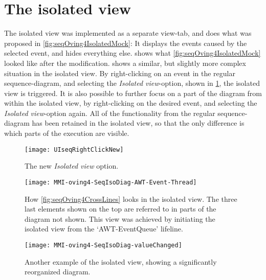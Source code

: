 \section{The isolated view}\label{isoView}

The isolated view was implemented as a separate view-tab, and does what was proposed in \cref{fig:seqOving4IsolatedMock}: It displays the events caused by the selected event, and hides everything else.
 shows what \cref{fig:seqOving4IsolatedMock} looked like after the modification.
 shows a similar, but slightly more complex situation in the isolated view.
By right-clicking on an event in the regular sequence-diagram, and selecting the \emph{Isolated view}-option, shown in \cref{fig:UISeqRightClickNew}, the isolated view is triggered.
It is also possible to further focus on a part of the diagram from within the isolated view, by right-clicking on the desired event, and selecting the \emph{Isolated view}-option again.
All of the functionality from the regular sequence-diagram has been retained in the isolated view, so that the only difference is which parts of the execution are visible.
\begin{figure}[H]
	\centering
	\texttt{[image: UIseqRightClickNew]}
	\caption{The new \emph{Isolated view} option.}
	\label{fig:UISeqRightClickNew}
\end{figure}

\begin{figure}[H]
	\centering
	\texttt{[image: MMI-oving4-SeqIsoDiag-AWT-Event-Thread]}
	\caption[How \cref{fig:seqOving4CrossLines} looks in the isolated view.]{How \cref{fig:seqOving4CrossLines} looks in the isolated view. The three last elements shown on the top are referred to in parts of the diagram not shown. This view was achieved by initiating the isolated view from the `AWT-EventQueue' lifeline.}
	\label{fig:MMI-oving4-SeqIsoDiag-AWT-Event-Thread}
\end{figure}

\begin{figure}[H]
	\centering
	\texttt{[image: MMI-oving4-SeqIsoDiag-valueChanged]}
	\caption{Another example of the isolated view, showing a significantly reorganized diagram.}
	\label{fig:MMI-oving4-SeqIsoDiag-valueChanged}
\end{figure}

